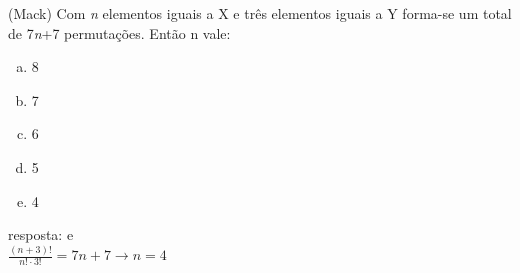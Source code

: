 \begin{ex}
 (Mack) Com \textit{n} elementos iguais a X e três elementos iguais a Y forma-se um total de 7\textit{n}+7 permutações. Então n vale:
    \begin{enumerate}[(a)]
    \item 8
    \item 7
    \item 6
    \item 5
    \item 4
    \end{enumerate}
      \begin{sol}
        resposta: e \\
        $\frac{(n+3)!}{n!\cdot3!}=7n+7\longrightarrow n=4$
      \end{sol}
\end{ex}
